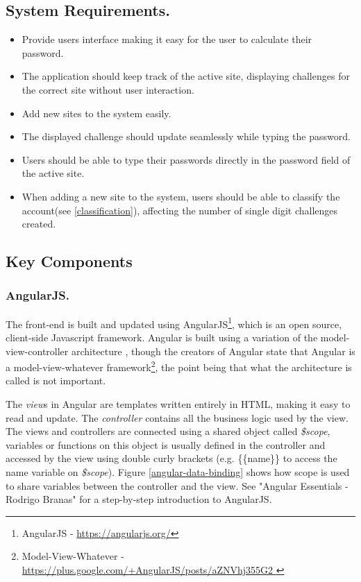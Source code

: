 \subsection{System Requirements.}
\begin{itemize}
    \item Provide users interface making it easy for the user to calculate their password.
    \item The application should keep track of the active site, displaying challenges for the correct site without user interaction.
    \item Add new sites to the system easily. 
    \item The displayed challenge should update seamlessly while typing the password.
    \item Users should be able to type their passwords directly in the password field of the active site.
    \item When adding a new site to the system, users should be able to classify the account(see \autoref{classification}), affecting the number of single digit challenges created.
\end{itemize}



\subsection{Key Components}

\subsubsection{AngularJS.} The front-end is built and updated using AngularJS\footnote{AngularJS - \url{https://angularjs.org/}}, which is an open source, client-side Javascript framework. Angular is built using a variation of the model-view-controller architecture \cite{mvc}, though the creators of Angular state that Angular is a model-view-whatever framework\footnote{Model-View-Whatever - \url{ https://plus.google.com/+AngularJS/posts/aZNVhj355G2 }}, the point being that what the architecture is called is not important. 
\par The \emph{view}s in Angular are templates written entirely in HTML, making it easy to read and update. The \emph{controller} contains all the business logic used by the view. The views and controllers are connected using a shared object called \emph{\$scope}, variables or functions on this object is usually defined in the controller and accessed by the view using double curly brackets (e.g. \{\{name\}\} to access the name variable on \emph{\$scope}). Figure \ref{angular-data-binding} shows how scope is used to share variables between the controller and the view. 
See "Angular Essentials - Rodrigo Branas"\cite{angularjs-book} for a step-by-step introduction to AngularJS.

